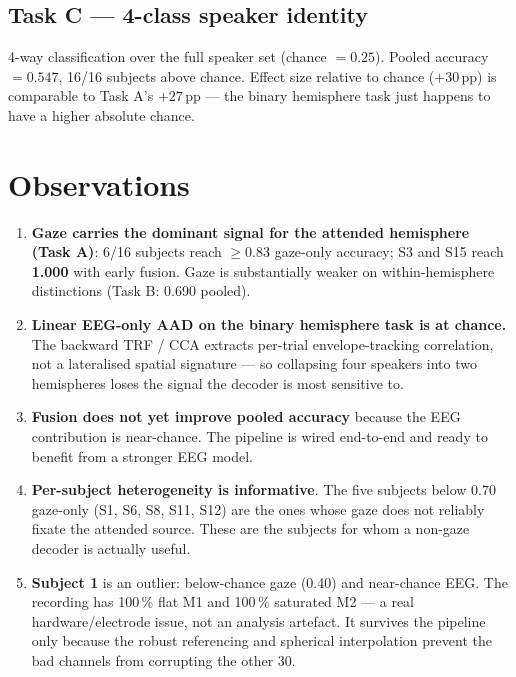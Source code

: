 \subsection{Task C --- 4-class speaker identity}

4-way classification over the full speaker set (chance $= 0.25$). Pooled
accuracy $= \mathbf{0.547}$, 16/16 subjects above chance. Effect size
relative to chance ($+30$\,pp) is comparable to Task A's $+27$\,pp --- the
binary hemisphere task just happens to have a higher absolute chance.

\section{Observations}

\begin{enumerate}
  \item \textbf{Gaze carries the dominant signal for the attended
        hemisphere (Task A)}: 6/16 subjects reach $\geq 0.83$ gaze-only
        accuracy; S3 and S15 reach \textbf{1.000} with early fusion. Gaze
        is substantially weaker on within-hemisphere distinctions (Task
        B: 0.690 pooled).
  \item \textbf{Linear EEG-only AAD on the binary hemisphere task is at
        chance.} The backward TRF / CCA extracts per-trial
        envelope-tracking correlation, not a lateralised spatial
        signature --- so collapsing four speakers into two hemispheres
        loses the signal the decoder is most sensitive to.
  \item \textbf{Fusion does not yet improve pooled accuracy} because the
        EEG contribution is near-chance. The pipeline is wired end-to-end
        and ready to benefit from a stronger EEG model.
  \item \textbf{Per-subject heterogeneity is informative}. The five
        subjects below $0.70$ gaze-only (S1, S6, S8, S11, S12) are the
        ones whose gaze does not reliably fixate the attended source. These
        are the subjects for whom a non-gaze decoder is actually useful.
  \item \textbf{Subject 1} is an outlier: below-chance gaze (0.40) and
        near-chance EEG. The recording has 100\,\% flat M1 and 100\,\%
        saturated M2 --- a real hardware/electrode issue, not an analysis
        artefact. It survives the pipeline only because the robust
        referencing and spherical interpolation prevent the bad channels
        from corrupting the other 30.
\end{enumerate}
